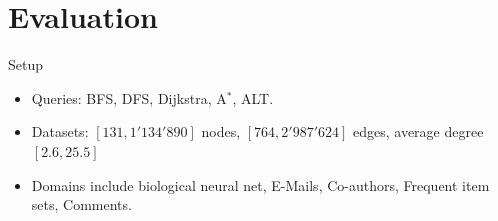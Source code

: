 \documentclass[rgb]{beamer}
\begin{document}
    \section{Evaluation}
        \begin{frame}{Setup}
        \begin{itemize}
         \item Queries: BFS, DFS, Dijkstra, A$^*$, ALT. \\ [1em]
         \item Datasets: $[131, 1'134'890]$ nodes, $[764, 2'987'624]$ edges, average degree $[2.6, 25.5]$ \\ [1em]
         \item Domains include biological neural net, E-Mails, Co-authors, Frequent item sets, Comments.
        \end{itemize}
        \end{frame}
        
\end{document}
